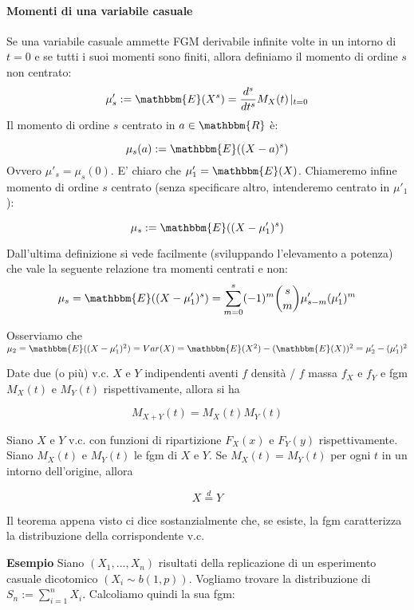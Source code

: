 \paragraph{Momenti di una variabile casuale}

\begin{definizione}
Se una variabile casuale ammette FGM derivabile infinite volte in un intorno di $t=0$ e se tutti i suoi momenti sono finiti, allora definiamo il momento di ordine $s$ non centrato: 
$$\mu'_s := \mathbbm{E} (X^s) = \frac{d^s}{dt^s} M_X (t) \! \mid_{t=0}$$ 
Il momento di ordine $s$ centrato in $a \in \mathbbm{R}$ è: 

$$\mu_s (a) := \mathbbm{E} ((X-a)^s)$$
Ovvero $\mu'_s = \mu_s (0)$. E' chiaro che $\mu'_1 = \mathbbm{E} (X)$.
Chiameremo infine momento di ordine $s$ centrato (senza specificare altro, intenderemo centrato in $\mu'_1$):

$$\mu_s := \mathbbm{E} ((X-\mu'_1)^s)$$
\end{definizione}

\begin{teo}
Dall'ultima definizione si vede facilmente (sviluppando l'elevamento a potenza) che vale la seguente relazione tra momenti centrati e non:
$$\mu_s = \mathbbm{E} ((X-\mu'_1)^s) = \displaystyle\sum_{m=0}^s (-1)^m \binom{s}{m} \mu'_{s-m} (\mu'_1)^m$$
\end{teo}
Osserviamo che $\mu_2 = \mathbbm{E} ((X-\mu'_1)^2) = Var(X) = \mathbbm{E} (X^2) - (\mathbbm{E} (X))^2 = \mu'_2 - (\mu'_1)^2$


\begin{teo}
Date due (o più) v.c. $X$ e $Y$ indipendenti aventi $f$ densità / $f$ massa $f_X$ e $f_Y$ e fgm $M_X(t)$ e $M_Y(t)$ rispettivamente, allora si ha

$$M_{X+Y}(t) = M_X(t) M_Y(t)$$
\end{teo}

\begin{teo}
Siano $X$ e $Y$ v.c. con funzioni di ripartizione $F_X(x)$ e $F_Y(y)$ rispettivamente. Siano $M_X(t)$ e $M_Y(t)$ le fgm di $X$ e $Y$. Se $M_X(t) = M_Y(t)$ per ogni $t$ in un intorno dell'origine, allora 

$$X \stackrel{d}{=} Y$$
\end{teo}

\begin{oss}
Il teorema appena visto ci dice sostanzialmente che, se esiste, la fgm caratterizza la distribuzione della corrispondente v.c.
\end{oss}
\noindent \textbf{Esempio}
Siano $(X_1,...,X_n)$ risultati della replicazione di un esperimento casuale dicotomico $(X_i \sim b(1,p))$. Vogliamo trovare la distribuzione di $S_n := \displaystyle\sum_{i=1}^n X_i$. Calcoliamo quindi la sua fgm:


